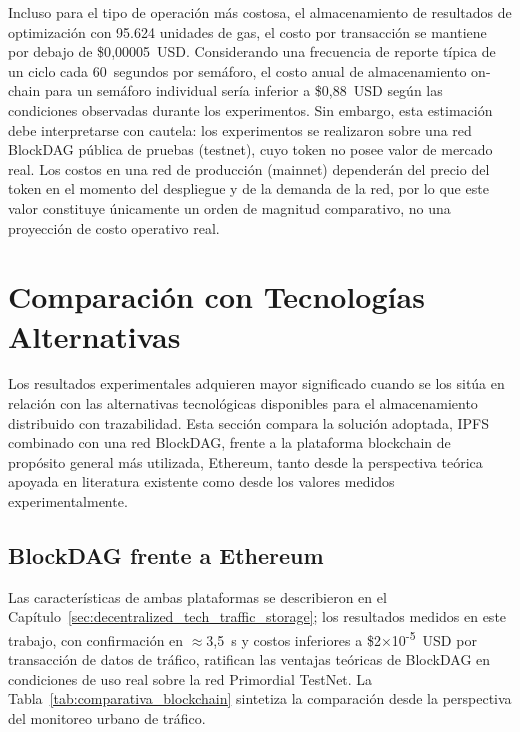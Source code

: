 Incluso para el tipo de operación más costosa, el almacenamiento de resultados de
optimización con 95.624 unidades de gas, el costo por transacción se mantiene por
debajo de \$0{,}00005~USD\@. Considerando una frecuencia de reporte típica de un ciclo
cada 60~segundos por semáforo, el costo anual de almacenamiento on-chain para un
semáforo individual sería inferior a \$0{,}88~USD según las condiciones observadas
durante los experimentos. Sin embargo, esta estimación debe interpretarse con cautela:
los experimentos se realizaron sobre una red BlockDAG pública de pruebas (testnet), cuyo
token no posee valor de mercado real. Los costos en una red de producción (mainnet)
dependerán del precio del token en el momento del despliegue y de la demanda de la red,
por lo que este valor constituye únicamente un orden de magnitud comparativo, no una
proyección de costo operativo real.

\section{Comparación con Tecnologías Alternativas}
\label{sec:experimentos_comparativa}

Los resultados experimentales adquieren mayor significado cuando se los sitúa en
relación con las alternativas tecnológicas disponibles para el almacenamiento
distribuido con trazabilidad. Esta sección compara la solución adoptada, IPFS
combinado con una red BlockDAG, frente a la plataforma blockchain de propósito
general más utilizada, Ethereum, tanto desde la perspectiva teórica apoyada en
literatura existente como desde los valores medidos experimentalmente.

\subsection{BlockDAG frente a Ethereum}
\label{subsec:comparativa_blockdag_ethereum}

Las características de ambas plataformas se describieron en el
Capítulo~\ref{sec:decentralized_tech_traffic_storage}; los resultados medidos en este
trabajo, con confirmación en $\approx$3,5~s y costos inferiores a
\$2$\times$10\textsuperscript{-5}~USD por transacción de datos de tráfico, ratifican las ventajas
teóricas de BlockDAG en condiciones de uso real sobre la red Primordial TestNet.
La Tabla~\ref{tab:comparativa_blockchain} sintetiza la comparación desde la perspectiva
del monitoreo urbano de tráfico.

